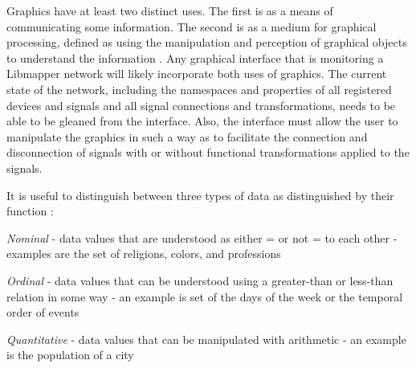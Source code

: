 Graphics have at least two distinct uses. The first is as a means of communicating some information. The second is as a medium for graphical processing, defined as using the manipulation and perception of graphical objects to understand the information \cite{card1997}. Any graphical interface that is monitoring a Libmapper network will likely incorporate both uses of graphics. The current state of the network, including the namespaces and properties of all registered devices and signals and all signal connections and transformations, needs to be able to be gleaned from the interface. Also, the interface must allow the user to manipulate the graphics in such a way as to facilitate the connection and disconnection of signals with or without functional transformations applied to the signals.

It is useful to distinguish between three types of data as distinguished by their function \cite{card1997}:
\begin{description}
\item \emph{Nominal} - data values that are understood as either = or not = to each other - examples are the set of religions, colors, and professions
\item \emph{Ordinal} - data values that can be understood using a greater-than or less-than relation in some way - an example is set of the days of the week or the temporal order of events
\item \emph{Quantitative} - data values that can be manipulated with arithmetic - an example is the population of a city 
\end{description}

